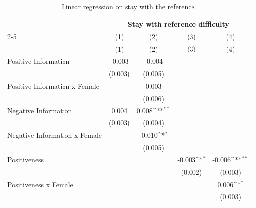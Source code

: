 \begin{table}[htbp]\centering
\def\sym#1{\ifmmode^{#1}\else\(^{#1}\)\fi}
\caption{Linear regression on stay with the reference}
\begin{tabular}{l*{4}{c}}
\toprule
                    &\multicolumn{4}{c}{Stay with reference difficulty}                                     \\\cmidrule(lr){2-5}
                    &\multicolumn{1}{c}{(1)}&\multicolumn{1}{c}{(2)}&\multicolumn{1}{c}{(3)}&\multicolumn{1}{c}{(4)}\\
                    &\multicolumn{1}{c}{(1)}&\multicolumn{1}{c}{(2)}&\multicolumn{1}{c}{(3)}&\multicolumn{1}{c}{(4)}\\
\midrule
Positive Information&      -0.003         &      -0.004         &                     &                     \\
                    &     (0.003)         &     (0.005)         &                     &                     \\
\addlinespace
Positive Information x Female&                     &       0.003         &                     &                     \\
                    &                     &     (0.006)         &                     &                     \\
\addlinespace
Negative Information&       0.004         &       0.008\sym{**} &                     &                     \\
                    &     (0.003)         &     (0.004)         &                     &                     \\
\addlinespace
Negative Information x Female&                     &      -0.010\sym{*}  &                     &                     \\
                    &                     &     (0.005)         &                     &                     \\
\addlinespace
Positiveness        &                     &                     &      -0.003\sym{*}  &      -0.006\sym{**} \\
                    &                     &                     &     (0.002)         &     (0.003)         \\
\addlinespace
Positiveness x Female&                     &                     &                     &       0.006\sym{*}  \\
                    &                     &                     &                     &     (0.003)         \\

\end{tabular}
\end{table}
